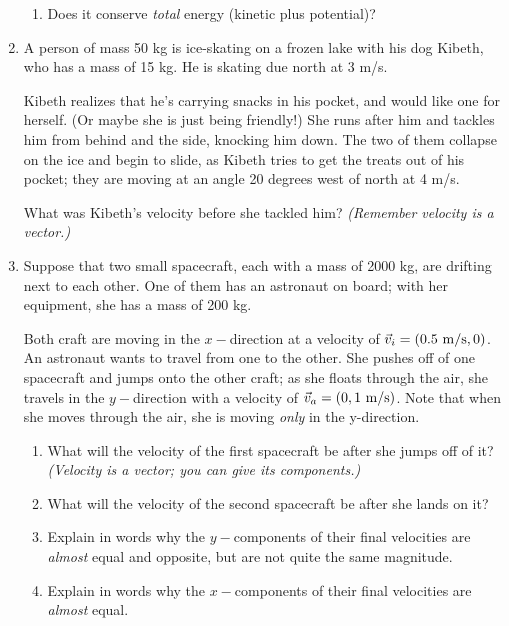 \documentclass[12pt]{article}
\begin{document}
\begin{enumerate}
{\begin{enumerate}
	\item Does it conserve {\it total} energy (kinetic plus potential)?
	\end{enumerate}
	
}

\bigskip

\item A person of mass 50 kg is ice-skating on a frozen lake with his dog Kibeth, who has a mass of 15 kg. He is skating due north at 3 m/s.

Kibeth realizes that he's carrying snacks in his pocket, and would like one for herself. (Or maybe she is just being friendly!) She runs after him and tackles him from behind and the side, knocking him down. The two of them collapse on the ice and begin to slide, as Kibeth tries to get the treats out of his pocket; they are moving at an angle 20 degrees west of north at 4 m/s.

What was Kibeth's velocity before she tackled him? {\it (Remember velocity is a vector.)}

\bigskip

\item Suppose that two small spacecraft, each with a mass of 2000 kg, are drifting next to each other. One of them has an astronaut on board; with her equipment, she has a mass of 200 kg. 

Both craft are moving in the $x-$direction at a velocity of $\vec v_i = (0.5~\rm m/\rm s, 0)$. An astronaut wants to travel from one to the other. She pushes off of one spacecraft and jumps onto the other craft; as she floats through the air, she travels in the $y-$direction with a velocity of $\vec v_a = (0, 1~\rm m/\rm s)$. Note that when she moves through the air, she is moving {\it only} in the y-direction.


\begin{enumerate}
	\item What will the velocity of the first spacecraft be after she jumps off of it? {\it (Velocity is a vector; you can give its components.)}
	
	
	\item What will the velocity of the second spacecraft be after she lands on it?
	
	
	\item Explain in words why the $y-$components of their final velocities are {\it almost} equal and opposite, but are not quite the same magnitude.
	
	\item Explain in words why the $x-$components of their final velocities are {\it almost} equal. 
\end{enumerate}


\end{enumerate}
\end{document}
